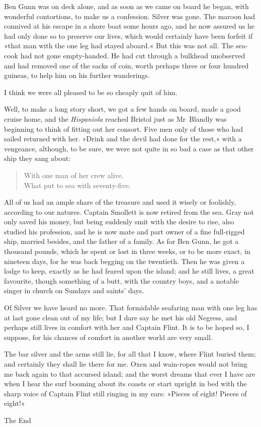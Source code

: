 Ben Gunn was on deck alone, and as soon as we came on board he began, with wonderful contortions, to make us a confession. Silver was gone. The maroon had connived at his escape in a shore boat some hours ago, and he now assured us he had only done so to preserve our lives, which would certainly have been forfeit if »that man with the one leg had stayed aboard.« But this was not all. The sea-cook had not gone empty-handed. He had cut through a bulkhead unobserved and had removed one of the sacks of coin, worth perhaps three or four hundred guineas, to help him on his further wanderings.

I think we were all pleased to be so cheaply quit of him.

Well, to make a long story short, we got a few hands on board, made a good cruise home, and the \textit{Hispaniola} reached Bristol just as Mr~Blandly was beginning to think of fitting out her consort. Five men only of those who had sailed returned with her. »Drink and the devil had done for the rest,« with a vengeance, although, to be sure, we were not quite in so bad a case as that other ship they sang about:

\blockquote{
With one man of her crew alive,\\
What put to sea with seventy-five.
}

All of us had an ample share of the treasure and used it wisely or foolishly, according to our natures. Captain Smollett is now retired from the sea. Gray not only saved his money, but being suddenly smit with the desire to rise, also studied his profession, and he is now mate and part owner of a fine full-rigged ship, married besides, and the father of a family. As for Ben Gunn, he got a thousand pounds, which he spent or lost in three weeks, or to be more exact, in nineteen days, for he was back begging on the twentieth. Then he was given a lodge to keep, exactly as he had feared upon the island; and he still lives, a great favourite, though something of a butt, with the country boys, and a notable singer in church on Sundays and saints' days.

Of Silver we have heard no more. That formidable seafaring man with one leg has at last gone clean out of my life; but I dare say he met his old Negress, and perhaps still lives in comfort with her and Captain Flint. It is to be hoped so, I suppose, for his chances of comfort in another world are very small.

The bar silver and the arms still lie, for all that I know, where Flint buried them; and certainly they shall lie there for me. Oxen and wain-ropes would not bring me back again to that accursed island; and the worst dreams that ever I have are when I hear the surf booming about its coasts or start upright in bed with the sharp voice of Captain Flint still ringing in my ears: »Pieces of eight! Pieces of eight!«
\vfill
\begin{center}
{\Huge\chapterfont The End}
\end{center}

